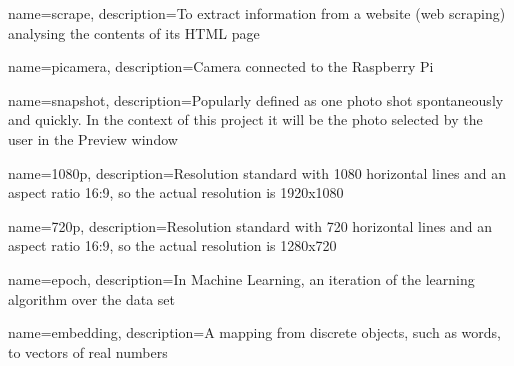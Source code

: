 
{
        name=scrape,
        description={To extract information from a website (web scraping) analysing the contents of its HTML page}
}


{
        name=picamera,
        description={Camera connected to the Raspberry Pi}
}

{
        name=snapshot,
        description={Popularly defined as one photo shot spontaneously and quickly. In the context of this project it will be the photo selected by the user in the Preview window}
}

{
        name=1080p,
        description={Resolution standard with 1080 horizontal lines and an aspect ratio 16:9, so the actual resolution is 1920x1080}
}

{
        name=720p,
        description={Resolution standard with 720 horizontal lines and an aspect ratio 16:9, so the actual resolution is 1280x720}
}

{
        name=epoch,
        description={In Machine Learning, an iteration of the learning algorithm over the data set}
}


{
        name=embedding,
        description={A mapping from discrete objects, such as words, to vectors of real numbers}
}











